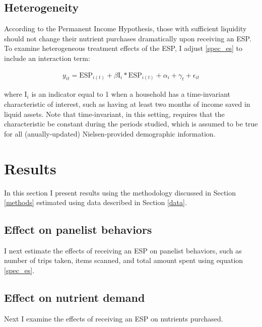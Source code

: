 \documentclass[12pt]{article}
\begin{document}
\subsection{Heterogeneity}

According to the Permanent Income Hypothesis, those with sufficient liquidity should not change their nutrient purchases dramatically upon receiving an ESP.
To examine heterogeneous treatment effects of the ESP, I adjust \ref{spec_es} to include an interaction term:

\begin{align}
	y_{it} = \text{ESP}_{i(t)} + \beta \text{I}_{i} * \text{ESP}_{i(t)} + \alpha_i + \gamma_t + \epsilon_{it} \label{spec_het}
\end{align}

where $\text{I}_{i}$ is an indicator equal to 1 when a household has a time-invariant characteristic of interest, such as having at least two months of income saved in liquid assets.
Note that time-invariant, in this setting, requires that the characteristic be constant during the periods studied, which is assumed to be true for all (anually-updated) Nielsen-provided demographic information.


\section{Results} \label{results}

In this section I present results using the methodology discussed in Section \ref{methods} estimated using data described in Section \ref{data}.

\subsection{Effect on panelist behaviors}

I next estimate the effects of receiving an ESP on panelist behaviors, such as number of trips taken, items scanned, and total amount spent using equation \ref{spec_es}.



\subsection{Effect on nutrient demand}

Next I examine the effects of receiving an ESP on nutrients purchased.
\end{document}
